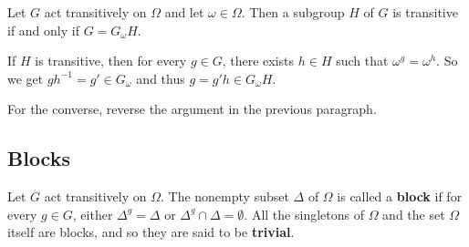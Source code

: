 \begin{proposition} \label{prop-Frattini-transitive}
	Let $G$ act transitively on $\Omega$ and let $\omega\in\Omega$. Then a subgroup $H$ of $G$ is transitive if and only if $G = G_\omega H$.
\end{proposition}
\begin{sketch}
If $H$ is transitive, then for every $g\in G$, there exists $h\in H$ such that $\omega^g = \omega^h$. So we get $gh^{-1} = g'\in G_\omega$ and thus $g = g'h\in G_\omega H$.
	
For the converse, reverse the argument in the previous paragraph.
\end{sketch}

\subsection{Blocks}
\begin{definition}
	Let $G$ act transitively on $\Omega$. The nonempty subset $\Delta$ of $\Omega$ is called a \textbf{block} if for every $g\in G$, either $\Delta^g=\Delta$ or $\Delta^g \cap \Delta = \emptyset$. All the singletons of $\Omega$ and the set $\Omega$ itself are blocks, and so they are said to be \textbf{trivial}.
\end{definition}



